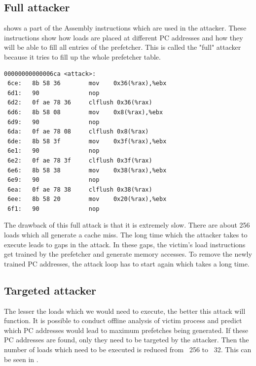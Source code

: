 \subsection{Full attacker}

 shows a part of the Assembly instructions
which are used in the attacker. These instructions show how loads are
placed at different PC addresses and how they will be able to fill
all entries of the prefetcher. This is called the "full" attacker because
it tries to fill up the whole prefetcher table.

\begin{lstlisting}[caption={Assembly showing load misses ar different PCs},
label={lst:full_attack}]
00000000000006ca <attack>:
 6ce:   8b 58 36        mov    0x36(%rax),%ebx
 6d1:   90              nop
 6d2:   0f ae 78 36     clflush 0x36(%rax)
 6d6:   8b 58 08        mov    0x8(%rax),%ebx
 6d9:   90              nop
 6da:   0f ae 78 08     clflush 0x8(%rax)
 6de:   8b 58 3f        mov    0x3f(%rax),%ebx
 6e1:   90              nop
 6e2:   0f ae 78 3f     clflush 0x3f(%rax)
 6e6:   8b 58 38        mov    0x38(%rax),%ebx
 6e9:   90              nop
 6ea:   0f ae 78 38     clflush 0x38(%rax)
 6ee:   8b 58 20        mov    0x20(%rax),%ebx
 6f1:   90              nop
\end{lstlisting}

The drawback of this full attack is that it is extremely slow. There are about
256 loads which all generate a cache miss. The long time which the attacker
takes to execute leads to gaps in the attack. In these gaps, the victim's
load instructions get trained by the
prefetcher and generate memory accesses. To remove the newly trained PC addresses,
the attack loop has to start again which takes a long time.

\subsection{Targeted attacker}

The lesser the loads which we would need to execute, the better this attack will
function. It is possible to conduct offline analysis of victim process
and predict which PC addresses would lead to maximum prefetches being generated.
If these PC addresses are found, only they need to be targeted by the attacker.
Then the number of loads which need to be executed is reduced from ~256 to ~32.
This can be seen in .

